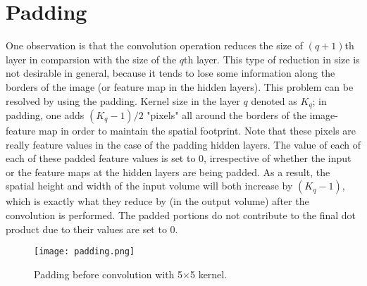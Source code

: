 \documentclass[11pt]{article}
\begin{document}
\section{Padding}
\hspace*{1cm} One observation is that the convolution operation reduces the size of $(q+1)$th layer in comparsion with the size of the $q$th layer. This type of reduction in size is not desirable in general, because it tends to lose some information along the borders of the image (or feature map in the hidden layers). This problem can be resolved by using the padding. Kernel size in the layer $q$ denoted as $K_q$; in padding, one adds $(K_q-1)/2$ "pixels" all around the borders of the image-feature map in order to maintain the spatial footprint. Note that these pixels are really feature values in the case of the padding hidden layers. The value of each of each of these padded feature values is set to 0, irrespective of whether the input or the feature maps at the hidden layers are being padded. As a result, the spatial height and width of the input volume will both increase by $(K_q-1)$, which is exactly what they reduce by (in the output volume) after the convolution is performed. The padded portions do not contribute to the final dot product due to their values are set to 0. 

\begin{figure}[H]
\centering
\texttt{[image: padding.png]}
\caption{Padding before convolution with 5$\times$5 kernel.}
\label{fig:figure3}
\end{figure}
\end{document}
